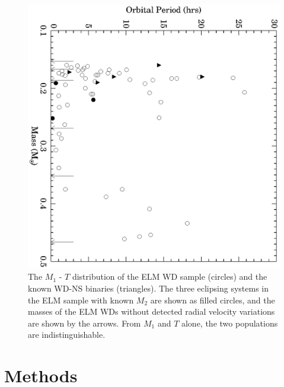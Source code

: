 \documentclass[apjl]{emulateapj}
\newcommand{\period}{T}
\begin{document}
\begin{figure}[h!]
\begin{center}
\includegraphics[angle=90,width=0.95\columnwidth]{Porb_M1.eps}
\caption{The $M_1$ - $\period$ distribution of the ELM WD sample (circles) and the known WD-NS binaries (triangles). The three eclipsing systems in the ELM sample with known $M_2$ are shown as filled circles, and the masses of the ELM WDs without detected radial velocity variations are shown by the arrows. From $M_1$ and $\period$ alone, the two populations are indistinguishable.}
\label{fig:Porb-M1}
\end{center}
\end{figure}




\section{Methods}
\end{document}
